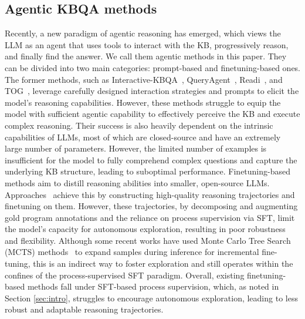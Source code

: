 \subsection{Agentic KBQA methods}
Recently, a new paradigm of agentic reasoning has emerged, which views the LLM as an agent that uses tools to interact with the KB, progressively reason, and finally find the answer. We call them agentic methods in this paper. They can be divided into two main categories: prompt-based and finetuning-based ones. The former methods, such as Interactive-KBQA~\citep{xiong2024interactive}, QueryAgent~\citep{huang2024queryagent}, Readi~\citep{cheng2024call}, and TOG~\citep{sunthink}, leverage carefully designed interaction strategies and prompts to elicit the model's reasoning capabilities. However, these methods struggle to equip the model with sufficient agentic capability to effectively perceive the KB and execute complex reasoning. Their success is also heavily dependent on the intrinsic capabilities of LLMs, most of which are closed-source and have an extremely large number of parameters. However, the limited number of examples is insufficient for the model to fully comprehend complex questions and capture the underlying KB structure, leading to suboptimal performance. Finetuning-based methods aim to distill reasoning abilities into smaller, open-source LLMs. Approaches~\citep{gu2023don,jiang2024kgagent,zhu2025knowagent, fang2024dara} achieve this by constructing high-quality reasoning trajectories and finetuning on them. However, these trajectories, by decomposing and augmenting gold program annotations and the reliance on process supervision via SFT, limit the model's capacity for autonomous exploration, resulting in poor robustness and flexibility. Although some recent works have used Monte Carlo Tree Search (MCTS) methods~\citep{luokbqao1, xiong2025mcts} to expand samples during inference for incremental fine-tuning, this is an indirect way to foster exploration and still operates within the confines of the process-supervised SFT paradigm. Overall, existing finetuning-based methods fall under SFT-based process supervision, which, as noted in Section \ref{sec:intro}, struggles to encourage autonomous exploration, leading to less robust and adaptable reasoning trajectories.